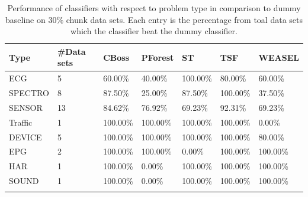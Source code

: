 \begin{table}[hp!]
	\setlength\extrarowheight{2pt} %
	\begin{tabularx}{\textwidth}{|X|X|X|X|X|X|X|}
	\hline
	\textbf{Type} & \textbf{\#Data sets} & \textbf{CBoss} & \textbf{PForest} & \textbf{ST} & \textbf{TSF} & \textbf{WEASEL} \\ \hline
		ECG & 5 & 60.00\% & 40.00\% & 100.00\% & 80.00\% & 60.00\% \\ \hline
		SPECTRO & 8 &87.50\% & 25.00\% & 87.50\% & 100.00\% & 37.50\% \\ \hline
		SENSOR & 13 & 84.62\% & 76.92\% & 69.23\% & 92.31\% & 69.23\% \\ \hline
		Traffic & 1 & 100.00\% & 100.00\% & 100.00\% & 100.00\% & 0.00\% \\ \hline
		DEVICE & 5 & 100.00\% & 100.00\% & 100.00\% & 100.00\% & 80.00\% \\ \hline
		EPG & 2 & 100.00\% & 100.00\% & 0.00\% & 100.00\% & 100.00\% \\ \hline
		HAR & 1 & 100.00\% & 0.00\% & 100.00\% & 100.00\% & 100.00\% \\ \hline
		SOUND & 1 & 100.00\% & 0.00\% & 100.00\% & 100.00\% & 100.00\% \\ \hline
  \caption{Performance of classifiers with respect to problem type in comparison to dummy baseline on 30\% chunk data sets. Each entry is the percentage from toal data sets which the classifier beat the dummy classifier.}
  \label{TableType30}
  \end{tabularx}
\end{table}


